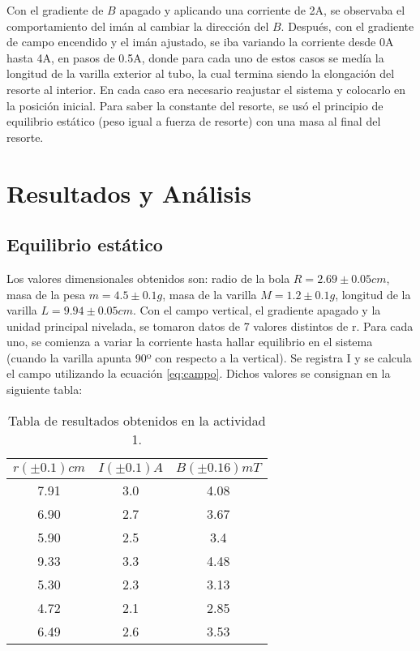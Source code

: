 \documentclass[%
 reprint,
 amsmath,amssymb,
 aps,
]{revtex4-1}
\begin{document}
Con el gradiente de $B$ apagado y aplicando una corriente de 2A, se observaba el comportamiento del imán al cambiar la dirección del $B$. Después, con el gradiente de campo encendido y el imán ajustado, se iba variando la corriente desde 0A hasta 4A, en pasos de 0.5A, donde para cada uno de estos casos se medía la longitud de la varilla exterior al tubo, la cual termina siendo la elongación del resorte al interior. En cada caso era necesario reajustar el sistema y colocarlo en la posición inicial. Para saber la constante del resorte, se usó el principio de equilibrio estático (peso igual a fuerza de resorte) con una masa al final del resorte.

\section{Resultados y Análisis}

\subsection{Equilibrio estático}

Los valores dimensionales obtenidos son: radio de la bola $R= 2.69 \pm 0.05 cm$, masa de la pesa $m= 4.5 \pm 0.1 g$, masa de la varilla $M= 1.2 \pm 0.1 g$, longitud de la varilla $L= 9.94 \pm 0.05 cm$. Con el campo vertical, el gradiente apagado y la unidad principal nivelada, se tomaron datos de 7 valores distintos de r. Para cada uno, se comienza a variar la corriente hasta hallar equilibrio en el sistema (cuando la varilla apunta 90º con respecto a la vertical). Se registra I y se calcula el campo utilizando la ecuación \ref{eq:campo}. Dichos valores se consignan en la siguiente tabla:

\begin{table}[H]
    \centering
    \begin{tabular}{|c|c|c|}
        \hline
        $r (\pm 0.1) cm$ & $I (\pm 0.1) A$ & $B (\pm 0.16) mT$ \\ \hline
         7.91 & 3.0 & 4.08 \\ \hline
         6.90 & 2.7 & 3.67 \\ \hline
         5.90 & 2.5 & 3.4 \\ \hline
         9.33 & 3.3 & 4.48 \\ \hline
         5.30 & 2.3 & 3.13 \\ \hline
         4.72 & 2.1 & 2.85 \\ \hline
         6.49 & 2.6 & 3.53 \\ \hline
         
    \end{tabular}
    \caption{Tabla de resultados obtenidos en la actividad 1.}
    \label{tab: tabla1}
\end{table}
\end{document}
